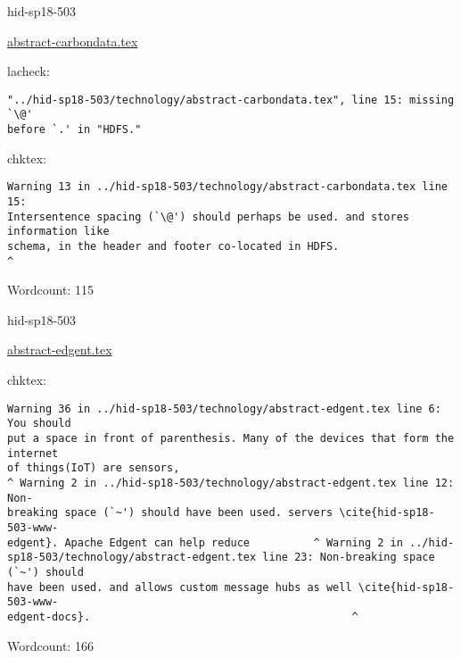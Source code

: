 \begin{IU}

hid-sp18-503

\href{https://github.com/cloudmesh-community/hid-sp18-503/blob/master//technology/abstract-carbondata.tex}{abstract-carbondata.tex}

 
lacheck:
\begin{tiny}
\begin{verbatim}
"../hid-sp18-503/technology/abstract-carbondata.tex", line 15: missing `\@'
before `.' in "HDFS."
\end{verbatim}
\end{tiny}
chktex:
\begin{tiny}
\begin{verbatim}
Warning 13 in ../hid-sp18-503/technology/abstract-carbondata.tex line 15:
Intersentence spacing (`\@') should perhaps be used. and stores information like
schema, in the header and footer co-located in HDFS.
^
\end{verbatim}
\end{tiny}

Wordcount: 115

\end{IU}



\begin{IU}

hid-sp18-503

\href{https://github.com/cloudmesh-community/hid-sp18-503/blob/master//technology/abstract-edgent.tex}{abstract-edgent.tex}

 
chktex:
\begin{tiny}
\begin{verbatim}
Warning 36 in ../hid-sp18-503/technology/abstract-edgent.tex line 6: You should
put a space in front of parenthesis. Many of the devices that form the internet
of things(IoT) are sensors,
^ Warning 2 in ../hid-sp18-503/technology/abstract-edgent.tex line 12: Non-
breaking space (`~') should have been used. servers \cite{hid-sp18-503-www-
edgent}. Apache Edgent can help reduce          ^ Warning 2 in ../hid-
sp18-503/technology/abstract-edgent.tex line 23: Non-breaking space (`~') should
have been used. and allows custom message hubs as well \cite{hid-sp18-503-www-
edgent-docs}.                                         ^
\end{verbatim}
\end{tiny}

Wordcount: 166

\end{IU}

